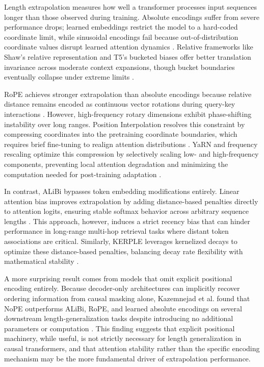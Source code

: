 \documentclass[conference]{IEEEtran}
\begin{document}
Length extrapolation measures how well a transformer processes input sequences longer than those observed during training. Absolute encodings suffer from severe performance drops; learned embeddings restrict the model to a hard-coded coordinate limit, while sinusoidal encodings fail because out-of-distribution coordinate values disrupt learned attention dynamics \cite{press2022}. Relative frameworks like Shaw's relative representation and T5's bucketed biases offer better translation invariance across moderate context expansions, though bucket boundaries eventually collapse under extreme limits \cite{shaw2018,raffel2020}.

RoPE achieves stronger extrapolation than absolute encodings because relative distance remains encoded as continuous vector rotations during query-key interactions \cite{su2024roformer}. However, high-frequency rotary dimensions exhibit phase-shifting instability over long ranges. Position Interpolation resolves this constraint by compressing coordinates into the pretraining coordinate boundaries, which requires brief fine-tuning to realign attention distributions \cite{chen2023}. YaRN and frequency rescaling optimize this compression by selectively scaling low- and high-frequency components, preventing local attention degradation and minimizing the computation needed for post-training adaptation \cite{peng2023yarn,liu2024scaling}.

In contrast, ALiBi bypasses token embedding modifications entirely. Linear attention bias improves extrapolation by adding distance-based penalties directly to attention logits, ensuring stable softmax behavior across arbitrary sequence lengths \cite{press2022}. This approach, however, induces a strict recency bias that can hinder performance in long-range multi-hop retrieval tasks where distant token associations are critical. Similarly, KERPLE leverages kernelized decays to optimize these distance-based penalties, balancing decay rate flexibility with mathematical stability \cite{chi2022}.

A more surprising result comes from models that omit explicit positional encoding entirely. Because decoder-only architectures can implicitly recover ordering information from causal masking alone, Kazemnejad et al. found that NoPE outperforms ALiBi, RoPE, and learned absolute encodings on several downstream length-generalization tasks despite introducing no additional parameters or computation \cite{kazemnejad2023}. This finding suggests that explicit positional machinery, while useful, is not strictly necessary for length generalization in causal transformers, and that attention stability rather than the specific encoding mechanism may be the more fundamental driver of extrapolation performance.
\end{document}
